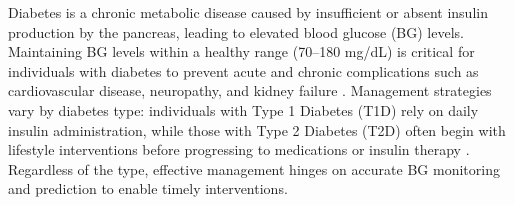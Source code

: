 \begin{comment}
Artificial intelligence can be used to support many aspects of diabetes care such as assessing risk of developing the disease, diagnosis, lifestyle recommendations among others \cite{mayya_need_2024}. Of interest in this study is the use of artificial intelligence, and so called data-driven methods, in the prediction of blood glucose levels. This subsequently raises the question, given if it is possible to predict future glucose values, what is the prediction horizon, or how far into the future can this prediction still be accurate. Addressing this question is impactful as it could allow for patients using only single finger sticks to have an idea of what their continuous glucose would be or could notify patients using continuous glucose monitoring that they need to take corrective action to avoid an adverse glycemic event.


Continuous glucose monitoring (CGM) systems have revolutionised diabetes care by providing minute-by-minute glucose readings, offering valuable insights into glucose dynamics that enable improved glycemic control and therapy adjustments. Unlike traditional self-monitoring of blood glucose (SMBG) methods, which rely on intermittent measurements such as finger prink samples, CGMs offer real-time trend analysis, allowing patients and clinicians to proactively manage glucose levels and reduce the risk of adverse events \cite{Heinemann2018, Beck2017, Battelino2019}.

\textcolor{red}{TO ALL : let me know if you agree with this: }
Despite these advantages, CGMs are not universally accessible, particularly for individuals with T2D, where SMBG remains the predominant method of glucose monitoring\textcolor{red}{ add reference here }. This project seeks to bridge this gap by investigating the minimum number of SMBG measurements required to predict future glucose values with accuracy comparable to CGMs. 

By leveraging \textcolor{red}{put here the method we ended up using }, this project evaluates whether subsampling CGM data—simulating SMBG measurements—can still provide reliable predictions of future blood glucose levels. 


\end{comment}

Diabetes is a chronic metabolic disease caused by insufficient or absent insulin production by the pancreas, leading to elevated blood glucose (BG) levels. Maintaining BG levels within a healthy range (70–180 mg/dL) is critical for individuals with diabetes to prevent acute and chronic complications such as cardiovascular disease, neuropathy, and kidney failure \cite{ADATIR, Roglic2016}. Management strategies vary by diabetes type: individuals with Type 1 Diabetes (T1D) rely on daily insulin administration, while those with Type 2 Diabetes (T2D) often begin with lifestyle interventions before progressing to medications or insulin therapy \cite{Roglic2016}. Regardless of the type, effective management hinges on accurate BG monitoring and prediction to enable timely interventions.

